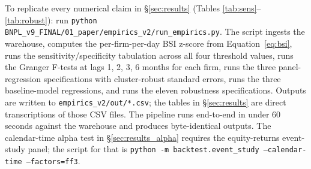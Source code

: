 \documentclass[11pt,a4paper]{article}
\begin{document}
{\sloppy To replicate every numerical claim in §\ref{sec:results} (Tables \ref{tab:sens}--\ref{tab:robust}): run \texttt{python BNPL\_v9\_FINAL/01\_paper/empirics\_v2/run\_empirics.py}. The script ingests the warehouse, computes the per-firm-per-day BSI z-score from Equation~\ref{eq:bsi}, runs the sensitivity/specificity tabulation across all four threshold values, runs the Granger F-tests at lags 1, 2, 3, 6 months for each firm, runs the three panel-regression specifications with cluster-robust standard errors, runs the three baseline-model regressions, and runs the eleven robustness specifications. Outputs are written to \texttt{empirics\_v2/out/*.csv}; the tables in §\ref{sec:results} are direct transcriptions of those CSV files. The pipeline runs end-to-end in under 60 seconds against the warehouse and produces byte-identical outputs. The calendar-time alpha test in §\ref{sec:results_alpha} requires the equity-returns event-study panel; the script for that is \texttt{python -m backtest.event\_study --calendar-time --factors=ff3}.}
\end{document}
